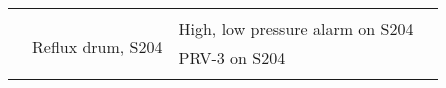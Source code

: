 \begin{table}[]
{\begin{tabular}{@{}llll@{}}
\multicolumn{1}{|l|}{}                    & \multicolumn{1}{l|}{}                                                                                      & \multicolumn{1}{l|}{}                                                                                                                                                                                                               & \multicolumn{1}{l|}{}                                                                                                                                                                                                                                                        \\ \cmidrule(l){2-4} 
\multicolumn{1}{|l|}{}                    & \multicolumn{1}{l|}{\multirow{3}{*}{Reflux drum, S204}}                                                    & \multicolumn{1}{l|}{High, low pressure alarm on S204}                                                                                                                                                                               & \multicolumn{1}{l|}{}                                                                                                                                                                                                                                                        \\ \cmidrule(l){3-4} 
\multicolumn{1}{|l|}{}                    & \multicolumn{1}{l|}{}                                                                                      & \multicolumn{1}{l|}{PRV-3 on S204}                                                                                                                                                                                                  & \multicolumn{1}{l|}{}                                                                                                                                                                                                                                                        \\ \cmidrule(l){3-4} 
\multicolumn{1}{|l|}{}                    & \multicolumn{1}{l|}{}                                                                                      & \multicolumn{1}{l|}{}                                                                                                                                                                                                               & \multicolumn{1}{l|}{}                                                                                                                                                                                                                                                        \\ \cmidrule(l){2-4} 

\end{tabular}}
\end{table}
